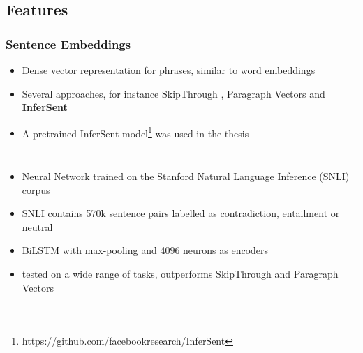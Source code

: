 \documentclass[11pt,aspectratio=169,usenames,dvipsnames]{beamer}
\begin{document}
    \subsection{Features}
    \frame{\subsectionpage}
    \begin{frame}[t]
        \frametitle{Sentence Embeddings}
        \begin{itemize}
            \item Dense vector representation for phrases, similar to word embeddings\pause
            \item Several approaches, for instance SkipThrough \cite{NIPS2015_5950}, Paragraph Vectors \cite{Le:2014aa} and \textbf{InferSent} \cite{Conneau:2017aa}
            \item A pretrained InferSent model\footnote{https://github.com/facebookresearch/InferSent} was used in the thesis
        \end{itemize}


    \end{frame}

    \begin{frame}[t]
        \begin{columns}
            \column{2.8in}
            \begin{itemize}
                \item<1-> Neural Network trained on the Stanford Natural Language Inference (SNLI) corpus
                \item<1-> SNLI contains 570k sentence pairs labelled as contradiction, entailment or neutral
                \item<2-> BiLSTM with max-pooling and 4096 neurons as encoders
                \item<2-> tested on a wide range of tasks, outperforms SkipThrough and Paragraph Vectors
            \end{itemize}
            \column{3in}
        \end{columns}
    \end{frame}
\end{document}

